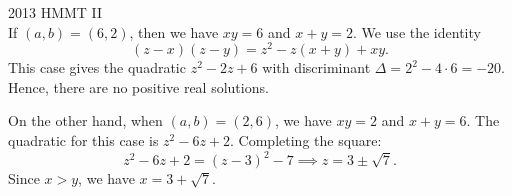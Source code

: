 \documentclass[xcolor=dvipsnames, fontsize=11pt, %
pagesize, %
parskip=half-, t]{beamer}
\begin{document}
\begin{frame}{2013 HMMT II}
			 ~\\
	If $(a,b)=(6,2)$, then we have $xy=6$ and $x+y=2$. We use the identity $$(z-x)(z-y)=z^2-z(x+y)+xy.$$ This case gives the quadratic $z^2-2z+6$ with discriminant $\Delta=2^2-4\cdot 6=-20$. Hence, there are no positive real solutions. \medskip
	
	On the other hand, when $(a,b)=(2,6)$, we have $xy=2$ and $x+y=6$. The quadratic for this case is $z^2-6z+2$. Completing the square: $$z^2-6z+2=(z-3)^2-7\implies z=3\pm \sqrt{7}.$$ Since $x>y$, we have $x=\boxed{3+\sqrt{7}}$.  
\end{frame}
\end{document}
